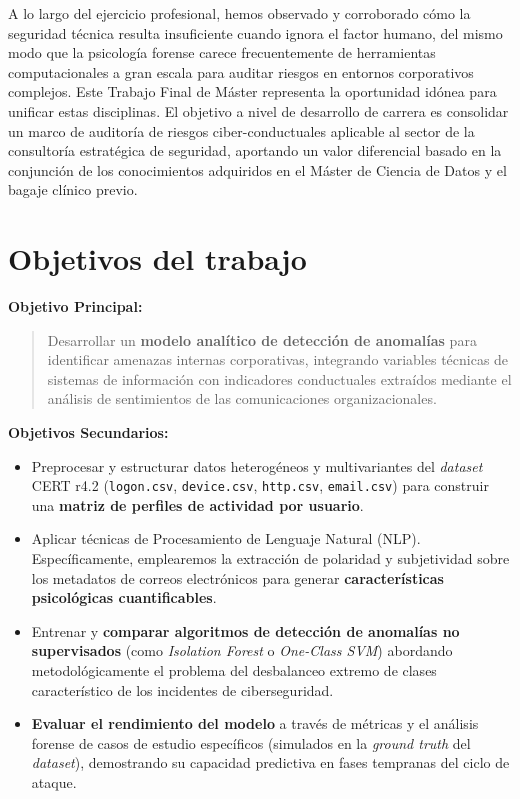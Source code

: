 \documentclass[IB]{TFUOC}%
\begin{document}
\medskip
\noindent A lo largo del ejercicio profesional, hemos observado y corroborado cómo la seguridad técnica resulta insuficiente cuando ignora el factor humano, del mismo modo que la psicología forense carece frecuentemente de herramientas computacionales a gran escala para auditar riesgos en entornos corporativos complejos. Este Trabajo Final de Máster representa la oportunidad idónea para unificar estas disciplinas. El objetivo a nivel de desarrollo de carrera es consolidar un marco de auditoría de riesgos ciber-conductuales aplicable al sector de la consultoría estratégica de seguridad, aportando un valor diferencial basado en la conjunción de los conocimientos adquiridos en el Máster de Ciencia de Datos y el bagaje clínico previo.


\section{Objetivos del trabajo}

\textbf{Objetivo Principal:} 

\begin{quote}
Desarrollar un \textbf{modelo analítico de detección de anomalías} para identificar amenazas internas corporativas, integrando variables técnicas de sistemas de información con indicadores conductuales extraídos mediante el análisis de sentimientos de las comunicaciones organizacionales.
\end{quote}


\textbf{Objetivos Secundarios:}

\begin{itemize}
    \item Preprocesar y estructurar datos heterogéneos y multivariantes del \textit{dataset} CERT r4.2 (\texttt{logon.csv}, \texttt{device.csv}, \texttt{http.csv}, \texttt{email.csv}) para construir una \textbf{matriz de perfiles de actividad por usuario}.
    \item Aplicar técnicas de Procesamiento de Lenguaje Natural (NLP). Específicamente, emplearemos la extracción de polaridad y subjetividad sobre los metadatos de correos electrónicos para generar \textbf{características psicológicas cuantificables}.
    \item Entrenar y \textbf{comparar algoritmos de detección de anomalías no supervisados} (como \textit{Isolation Forest} o \textit{One-Class SVM}) abordando metodológicamente el problema del desbalanceo extremo de clases característico de los incidentes de ciberseguridad.
    \item \textbf{Evaluar el rendimiento del modelo} a través de métricas y el análisis forense de casos de estudio específicos (simulados en la \textit{ground truth} del \textit{dataset}), demostrando su capacidad predictiva en fases tempranas del ciclo de ataque.
\end{itemize}
\end{document}
